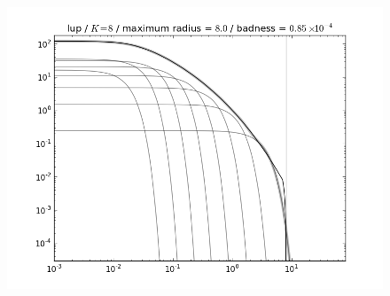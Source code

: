 \documentclass[12pt,pdftex,preprint]{aastex}
\newlength{\figwidth}
\begin{document}
\begin{figure}
\includegraphics[width=\figwidth]{K08_MR08_LSD04_lup_log.png}
\end{figure}
\end{document}
